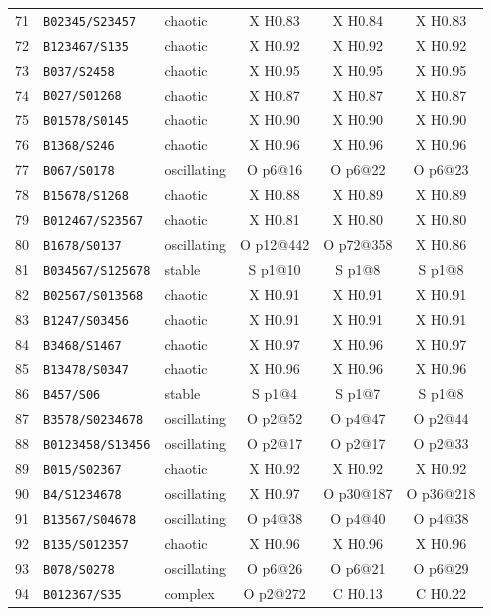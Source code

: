 {\begin{longtable}{@{}rllccc@{}}
71 & \texttt{B02345/S23457} & chaotic & X H0.83 & X H0.84 & X H0.83 \\
72 & \texttt{B123467/S135} & chaotic & X H0.92 & X H0.92 & X H0.92 \\
73 & \texttt{B037/S2458} & chaotic & X H0.95 & X H0.95 & X H0.95 \\
74 & \texttt{B027/S01268} & chaotic & X H0.87 & X H0.87 & X H0.87 \\
75 & \texttt{B01578/S0145} & chaotic & X H0.90 & X H0.90 & X H0.90 \\
76 & \texttt{B1368/S246} & chaotic & X H0.96 & X H0.96 & X H0.96 \\
77 & \texttt{B067/S0178} & oscillating & O p6@16 & O p6@22 & O p6@23 \\
78 & \texttt{B15678/S1268} & chaotic & X H0.88 & X H0.89 & X H0.89 \\
79 & \texttt{B012467/S23567} & chaotic & X H0.81 & X H0.80 & X H0.80 \\
80 & \texttt{B1678/S0137} & oscillating & O p12@442 & O p72@358 & X H0.86 \\
81 & \texttt{B034567/S125678} & stable & S p1@10 & S p1@8 & S p1@8 \\
82 & \texttt{B02567/S013568} & chaotic & X H0.91 & X H0.91 & X H0.91 \\
83 & \texttt{B1247/S03456} & chaotic & X H0.91 & X H0.91 & X H0.91 \\
84 & \texttt{B3468/S1467} & chaotic & X H0.97 & X H0.96 & X H0.97 \\
85 & \texttt{B13478/S0347} & chaotic & X H0.96 & X H0.96 & X H0.96 \\
86 & \texttt{B457/S06} & stable & S p1@4 & S p1@7 & S p1@8 \\
87 & \texttt{B3578/S0234678} & oscillating & O p2@52 & O p4@47 & O p2@44 \\
88 & \texttt{B0123458/S13456} & oscillating & O p2@17 & O p2@17 & O p2@33 \\
89 & \texttt{B015/S02367} & chaotic & X H0.92 & X H0.92 & X H0.92 \\
90 & \texttt{B4/S1234678} & oscillating & X H0.97 & O p30@187 & O p36@218 \\
91 & \texttt{B13567/S04678} & oscillating & O p4@38 & O p4@40 & O p4@38 \\
92 & \texttt{B135/S012357} & chaotic & X H0.96 & X H0.96 & X H0.96 \\
93 & \texttt{B078/S0278} & oscillating & O p6@26 & O p6@21 & O p6@29 \\
94 & \texttt{B012367/S35} & complex & O p2@272 & C H0.13 & C H0.22 \\

\end{longtable}}
